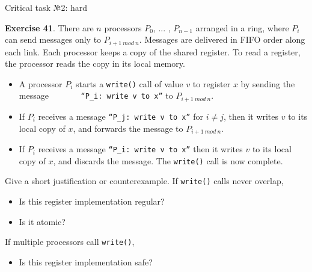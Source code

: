 \begin{frame}{Critical task №2: hard}

\textbf{Exercise 41}. There are $n$ processors $P_0$, ... , $P_{n-1}$ arranged in a ring, where $P_i$ can send messages only to $P_{i+1 \ mod \ n}$.
Messages are delivered in FIFO order along each link. Each processor keeps a copy of the shared register. To read a register, the processor reads the copy in its local memory.

\begin{itemize}
  \item A processor $P_i$ starts a \texttt{write()} call of value $v$ to register $x$ by sending the message \ \ \ \ \ \ \ \texttt{“$P_i$: write v to x”} to $P_{i+1 \ mod \ n}$.
  \item If $P_i$ receives a message \texttt{“$P_j$: write v to x”} for $i \neq j$, then it writes $v$ to its local copy of $x$, and forwards the message to $P_{i+1 \ mod\  n}$.
  \item If $P_i$ receives a message \texttt{“$P_i$: write v to x”} then it writes $v$ to its local copy of $x$, and discards the message. The \texttt{write()} call is now complete.
\end{itemize}

Give a short justification or counterexample.
If \texttt{write()} calls never overlap,
\begin{itemize}
  \item Is this register implementation regular?
  \item Is it atomic?
\end{itemize}

If multiple processors call \texttt{write()},
\begin{itemize}
  \item Is this register implementation safe?
\end{itemize}


\end{frame}

